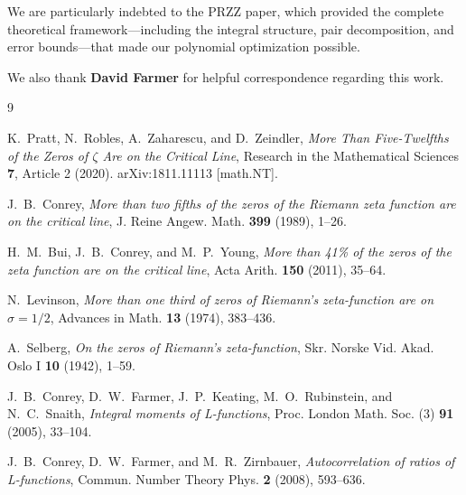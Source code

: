 \documentclass[11pt]{article}
\begin{document}
We are particularly indebted to the PRZZ paper, which provided the complete theoretical framework---including the integral structure, pair decomposition, and error bounds---that made our polynomial optimization possible.

We also thank \textbf{David Farmer} for helpful correspondence regarding this work.

\begin{thebibliography}{9}

K.~Pratt, N.~Robles, A.~Zaharescu, and D.~Zeindler,
\textit{More Than Five-Twelfths of the Zeros of $\zeta$ Are on the Critical Line},
Research in the Mathematical Sciences \textbf{7}, Article 2 (2020).
arXiv:1811.11113 [math.NT].

J.~B.~Conrey,
\textit{More than two fifths of the zeros of the Riemann zeta function are on the critical line},
J. Reine Angew. Math. \textbf{399} (1989), 1--26.

H.~M.~Bui, J.~B.~Conrey, and M.~P.~Young,
\textit{More than 41\% of the zeros of the zeta function are on the critical line},
Acta Arith. \textbf{150} (2011), 35--64.

N.~Levinson,
\textit{More than one third of zeros of Riemann's zeta-function are on $\sigma = 1/2$},
Advances in Math. \textbf{13} (1974), 383--436.

A.~Selberg,
\textit{On the zeros of Riemann's zeta-function},
Skr. Norske Vid. Akad. Oslo I \textbf{10} (1942), 1--59.

J.~B.~Conrey, D.~W.~Farmer, J.~P.~Keating, M.~O.~Rubinstein, and N.~C.~Snaith,
\textit{Integral moments of L-functions},
Proc. London Math. Soc. (3) \textbf{91} (2005), 33--104.

J.~B.~Conrey, D.~W.~Farmer, and M.~R.~Zirnbauer,
\textit{Autocorrelation of ratios of L-functions},
Commun. Number Theory Phys. \textbf{2} (2008), 593--636.

\end{thebibliography}
\end{document}
